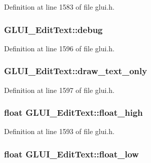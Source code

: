 Definition at line 1583 of file glui.\+h.

\hypertarget{class_g_l_u_i___edit_text_ad6006ae65e038eb60f011c8c7200b9ea}{
\subsubsection[{debug}]{ G\+L\+U\+I\+\_\+\+Edit\+Text\+::debug}}\label{class_g_l_u_i___edit_text_ad6006ae65e038eb60f011c8c7200b9ea}


Definition at line 1596 of file glui.\+h.

\hypertarget{class_g_l_u_i___edit_text_aa6044d58c37fd18e9b5e83a153cfd108}{
\subsubsection[{draw\+\_\+text\+\_\+only}]{ G\+L\+U\+I\+\_\+\+Edit\+Text\+::draw\+\_\+text\+\_\+only}}\label{class_g_l_u_i___edit_text_aa6044d58c37fd18e9b5e83a153cfd108}


Definition at line 1597 of file glui.\+h.

\hypertarget{class_g_l_u_i___edit_text_abb9f58f751bb995c3c8e52dc5c085bfd}{
\subsubsection[{float\+\_\+high}]{\setlength{\rightskip}{0pt plus 5cm}float G\+L\+U\+I\+\_\+\+Edit\+Text\+::float\+\_\+high}}\label{class_g_l_u_i___edit_text_abb9f58f751bb995c3c8e52dc5c085bfd}


Definition at line 1593 of file glui.\+h.

\hypertarget{class_g_l_u_i___edit_text_ac7f609e99bd8732d5026c7f57d5c8cd9}{
\subsubsection[{float\+\_\+low}]{\setlength{\rightskip}{0pt plus 5cm}float G\+L\+U\+I\+\_\+\+Edit\+Text\+::float\+\_\+low}}\label{class_g_l_u_i___edit_text_ac7f609e99bd8732d5026c7f57d5c8cd9}


